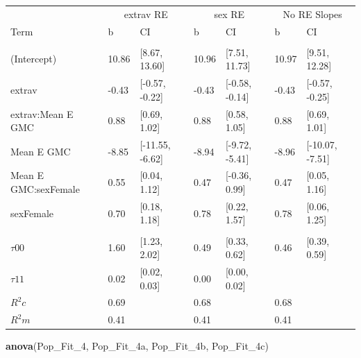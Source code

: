 \documentclass[]{article}
\newenvironment{Shaded}{\begin{snugshade}}{\end{snugshade}}
\newcommand{\KeywordTok}[1]{\textcolor[rgb]{0.13,0.29,0.53}{\textbf{#1}}}
\newcommand{\DecValTok}[1]{\textcolor[rgb]{0.00,0.00,0.81}{#1}}
\newcommand{\NormalTok}[1]{#1}
\begin{document}
\begin{tabular}{lllllll}
\toprule
\multicolumn{1}{c}{ } & \multicolumn{2}{c}{extrav RE} & \multicolumn{2}{c}{sex RE} & \multicolumn{2}{c}{No RE Slopes} \\
\cmidrule(l{2pt}r{2pt}){2-3} \cmidrule(l{2pt}r{2pt}){4-5} \cmidrule(l{2pt}r{2pt}){6-7}
Term & b & CI & b & CI & b & CI\\
\midrule
\addlinespace[0.3em]
\multicolumn{7}{l}{\textbf{Fixed}}\\
\hspace{1em}(Intercept) & 10.86 & [8.67, 13.60] & 10.96 & [7.51, 11.73] & 10.97 & [9.51, 12.28]\\
\hspace{1em}extrav & -0.43 & [-0.57, -0.22] & -0.43 & [-0.58, -0.14] & -0.43 & [-0.57, -0.25]\\
\hspace{1em}extrav:Mean E GMC & 0.88 & [0.69, 1.02] & 0.88 & [0.58, 1.05] & 0.88 & [0.69, 1.01]\\
\hspace{1em}Mean E GMC & -8.85 & [-11.55, -6.62] & -8.94 & [-9.72, -5.41] & -8.96 & [-10.07, -7.51]\\
\hspace{1em}Mean E GMC:sexFemale & 0.55 & [0.04, 1.12] & 0.47 & [-0.36, 0.99] & 0.47 & [0.05, 1.16]\\
\hspace{1em}sexFemale & 0.70 & [0.18, 1.18] & 0.78 & [0.22, 1.57] & 0.78 & [0.06, 1.25]\\
\addlinespace[0.3em]
\multicolumn{7}{l}{\textbf{Random}}\\
\hspace{1em}$\tau {00}$ & 1.60 & [1.23, 2.02] & 0.49 & [0.33, 0.62] & 0.46 & [0.39, 0.59]\\
\hspace{1em}$\tau {11}$ & 0.02 & [0.02, 0.03] & 0.00 & [0.00, 0.02] &  & \\
$R^2 c$ & 0.69 &  & 0.68 &  & 0.68 & \\
$R^2 m$ & 0.41 &  & 0.41 &  & 0.41 & \\
\bottomrule
\end{tabular}

\begin{Shaded}
\begin{Highlighting}[]
\KeywordTok{anova}\NormalTok{(Pop_Fit_}\DecValTok{4}\NormalTok{, Pop_Fit_4a, Pop_Fit_4b, Pop_Fit_4c)}
\end{Highlighting}
\end{Shaded}
\end{document}
